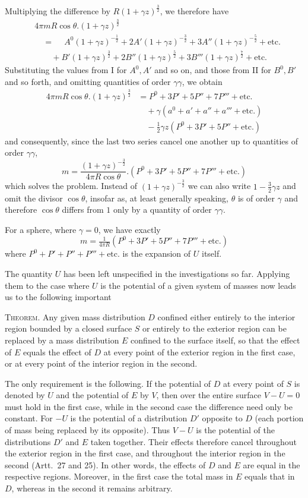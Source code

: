 Multiplying the difference by $R(1+\gamma z)^{\frac32}$, we therefore have
\[
\begin{aligned}
&4\pi mR\cos\theta.(1+\gamma z)^{\frac32}\\
&\quad=\phantom{{}+{}}A^0(1+\gamma z)^{-\frac12}+2A'(1+\gamma z)^{-\frac32}+3A''(1+\gamma z)^{-\frac52}+\text{etc.}\\
&\qquad+B'(1+\gamma z)^{\frac32}+2B''(1+\gamma z)^{\frac52}+3B'''(1+\gamma z)^{\frac72}+\text{etc.}
\end{aligned}
\]
Substituting the values from I for $A^0,A'$ and so on, and those from II for $B^0,B'$ and so forth, and omitting quantities of order $\gamma\gamma$, we obtain
\[
\begin{aligned}
4\pi mR\cos\theta.(1+\gamma z)^{\frac32}&=P^0+3P'+5P''+7P'''+\text{etc.}\\
&\quad+\gamma(a^0+a'+a''+a'''+\text{etc.})\\
&\quad-\tfrac12\gamma z(P^0+3P'+5P''+\text{etc.})
\end{aligned}
\]
and consequently, since the last two series cancel one another up to quantities of order $\gamma\gamma$,
\[
m=\frac{(1+\gamma z)^{-\frac32}}{4\pi R\cos\theta}.(P^0+3P'+5P''+7P'''+\text{etc.})
\]
which solves the problem. Instead of $(1+\gamma z)^{-\frac32}$ we can also write $1-\frac32\gamma z$ and omit the divisor $\cos\theta$, insofar as, at least generally speaking, $\theta$ is of order $\gamma$ and therefore $\cos\theta$ differs from $1$ only by a quantity of order $\gamma\gamma$.

For a sphere, where $\gamma=0$, we have exactly
\[
m=\tfrac1{4\pi R}(P^0+3P'+5P''+7P'''+\text{etc.})
\]
where $P^0+P'+P''+P'''+\text{etc.}$ is the expansion of $U$ itself.

The quantity $U$ has been left unspecified in the investigations so far. Applying them to the case where $U$ is the potential of a given system of masses now leads us to the following important

\textsc{Theorem.} Any given mass distribution $D$ confined either entirely to the interior region bounded by a closed surface $S$ or entirely to the exterior region can be replaced by a mass distribution $E$ confined to the surface itself, so that the
effect of $E$ equals the effect of $D$ at every point of the exterior region in the first case, or at every point of the interior region in the second.

The only requirement is the following. If the potential of $D$ at every point of $S$ is denoted by $U$ and the potential of $E$ by $V$, then over the entire surface $V-U=0$ must hold in the first case, while in the second case the difference need only be constant. For $-U$ is the potential of a distribution $D'$ opposite to $D$ (each portion of mass being replaced by its opposite). Thus $V-U$ is the potential of the distributions $D'$ and $E$ taken together. Their effects therefore cancel throughout the exterior region in the first case, and throughout the interior region in the second (Artt.\ 27 and 25). In other words, the effects of $D$ and $E$ are equal in the respective regions. Moreover, in the first case the total mass in $E$ equals that in $D$, whereas in the second it remains arbitrary.

